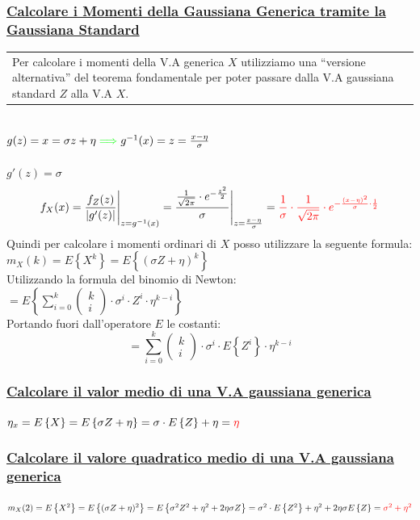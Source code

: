 \documentclass{article}
\begin{document}
\subsubsection{\underline{Calcolare i Momenti della Gaussiana Generica tramite la Gaussiana Standard}}
\begin{tabular}{|p{13cm}}
Per calcolare i momenti della V.A generica $X$ utilizziamo una “versione alternativa” del teorema fondamentale per poter passare dalla V.A gaussiana standard $Z$ alla V.A $X$.
\end{tabular} \\
$g(z) = x = \sigma z + \eta 
{\color{green}\implies}
g^{-1}(x) = z = \frac{x - \eta }{\sigma}$ \\ \\
$g'(z) = \sigma$ \\
\[f_X(x) = \frac{f_Z(z)}{|g'(z)|} \Bigg|_{z = g^{-1}(x)} = \frac{\frac{1}{\sqrt{2 \pi }} \cdot e^{-\frac{z^2}{2}} }{\sigma} \Bigg|_{z = \frac{x-\eta}{\sigma}}
=
\color{red} \frac  1 \sigma \cdot \frac{1}{\sqrt{2\pi}} \cdot e^{- \frac{\left( x - \eta \right)^2}{\sigma} \cdot \frac 12}\]
Quindi per calcolare i momenti ordinari di $X$ posso utilizzare la seguente formula: \\
$m_X(k) = E \left\{X^k\right\} = E \left\{(\sigma Z + \eta)^k\right\}$ \\
Utilizzando la formula del binomio di Newton: $= E \left\{ \sum_{i=0}^{k} \left( \begin{matrix} k \\ i\end{matrix} \right) \cdot \sigma^i \cdot Z^i \cdot \eta^{k-i}\right\}$ \\
Portando fuori dall’operatore $E$ le costanti:
\[= \sum_{i=0}^{k} \left( \begin{matrix} k \\ i\end{matrix} \right) \cdot \sigma^i \cdot E \left\{ Z^i \right\}\cdot \eta^{k-i}\]
\subsubsection{\underline{Calcolare il valor medio di una V.A gaussiana generica}}
$\eta_x = E \left\{X\right\} = E \left\{\sigma Z + \eta \right\} = \sigma \cdot E \left\{Z\right\} + \eta = \color{red}\eta$
\subsubsection{\underline{Calcolare il valore quadratico medio di una V.A gaussiana generica}}
$m_X(2) = E \left\{ X^2 \right\} = E \left\{(\sigma Z + \eta)^2\right\} = E \left\{ \sigma^2 Z^2 + \eta^2 + 2 \eta \sigma Z \right\} = \sigma^2 \cdot E \left\{ Z^2 \right\}+ \eta^2 + 2 \eta \sigma E\left\{Z\right\} = \color{red} \sigma^2 + \eta^2$
\end{document}
